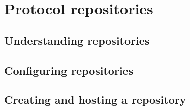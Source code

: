 \chapter{Protocol repositories}
\label{ch:ProtocolRepositories}


\section{Understanding repositories}


\section{Configuring repositories}


\section{Creating and hosting a repository}